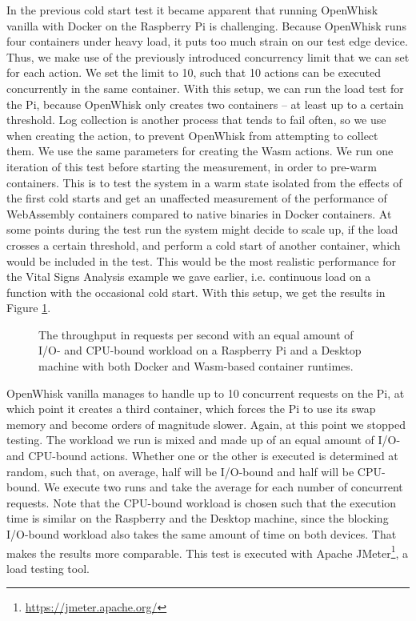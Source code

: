 In the previous cold start test it became apparent that running OpenWhisk vanilla with Docker on the Raspberry Pi is challenging. Because OpenWhisk runs four containers under heavy load, it puts too much strain on our test edge device. Thus, we make use of the previously introduced concurrency limit that we can set for each action. We set the limit to 10, such that 10 actions can be executed concurrently in the same container. With this setup, we can run the load test for the Pi, because OpenWhisk only creates two containers -- at least up to a certain threshold. Log collection is another process that tends to fail often, so we use  when creating the action, to prevent OpenWhisk from attempting to collect them. We use the same parameters for creating the Wasm actions. We run one iteration of this test before starting the measurement, in order to pre-warm containers. This is to test the system in a warm state isolated from the effects of the first cold starts and get an unaffected measurement of the performance of WebAssembly containers compared to native binaries in Docker containers. At some points during the test run the system might decide to scale up, if the load crosses a certain threshold, and perform a cold start of another container, which would be included in the test. This would be the most realistic performance for the Vital Signs Analysis example we gave earlier, i.e. continuous load on a function with the occasional cold start. With this setup, we get the results in Figure \ref{fig:pi-pc-load-mixed}.

\begin{figure}
    \begin{center}
        
    \end{center}
    \caption{The throughput in requests per second with an equal amount of I/O- and CPU-bound workload on a Raspberry Pi and a Desktop machine with both Docker and Wasm-based container runtimes.}
    \label{fig:pi-pc-load-mixed}
\end{figure}

OpenWhisk vanilla manages to handle up to 10 concurrent requests on the Pi, at which point it creates a third container, which forces the Pi to use its swap memory and become orders of magnitude slower. Again, at this point we stopped testing. The workload we run is mixed and made up of an equal amount of I/O- and CPU-bound actions. Whether one or the other is executed is determined at random, such that, on average, half will be I/O-bound and half will be CPU-bound. We execute two runs and take the average for each number of concurrent requests. Note that the CPU-bound workload is chosen such that the execution time is similar on the Raspberry and the Desktop machine, since the blocking I/O-bound workload also takes the same amount of time on both devices. That makes the results more comparable. This test is executed with Apache JMeter\footnote{\url{https://jmeter.apache.org/}}, a load testing tool. 

